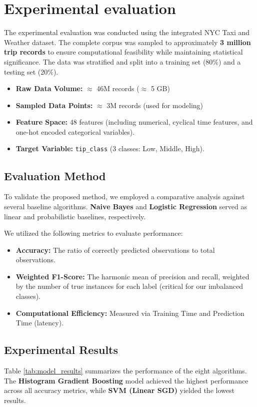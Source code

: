 \documentclass[11pt]{article}
\begin{document}
\section{Experimental evaluation}
The experimental evaluation was conducted using the integrated NYC Taxi and Weather dataset. The complete corpus was sampled to approximately \textbf{3 million trip records} to ensure computational feasibility while maintaining statistical significance. The data was stratified and split into a training set (80\%) and a testing set (20\%).

\begin{itemize}
    \item \textbf{Raw Data Volume:} $\approx$ 46M records ($\approx$ 5 GB)
    \item \textbf{Sampled Data Points:} $\approx$ 3M records (used for modeling)
    \item \textbf{Feature Space:} 48 features (including numerical, cyclical time features, and one-hot encoded categorical variables).
    \item \textbf{Target Variable:} \texttt{tip\_class} (3 classes: Low, Middle, High).
\end{itemize}

\subsection{Evaluation Method}
To validate the proposed method, we employed a comparative analysis against several baseline algorithms. \textbf{Naive Bayes} and \textbf{Logistic Regression} served as linear and probabilistic baselines, respectively.

We utilized the following metrics to evaluate performance:
\begin{itemize}
    \item \textbf{Accuracy:} The ratio of correctly predicted observations to total observations.
    \item \textbf{Weighted F1-Score:} The harmonic mean of precision and recall, weighted by the number of true instances for each label (critical for our imbalanced classes).
    \item \textbf{Computational Efficiency:} Measured via Training Time and Prediction Time (latency).
\end{itemize}

\subsection{Experimental Results}
Table \ref{tab:model_results} summarizes the performance of the eight algorithms. The \textbf{Histogram Gradient Boosting} model achieved the highest performance across all accuracy metrics, while \textbf{SVM (Linear SGD)} yielded the lowest results.
\end{document}
